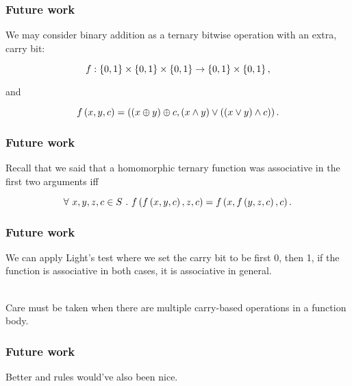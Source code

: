 \begin{frame}[plain]

\frametitle{Future work}

We may consider binary addition as a ternary bitwise operation with an extra,
carry bit:

\[f : \left\{{0,1}\right\} \times \left\{{0,1}\right\} \times \left\{{0,1}\right\} \rightarrow \left\{{0,1}\right\} \times
\left\{{0,1}\right\},\]

and

\[f\left({x,y,c}\right)=\left({\left({x \oplus y}\right) \oplus c, \left({x \wedge y}\right) \vee \left({ \left({ x \vee y}\right)
\wedge c}\right)}\right).\]

\end{frame}

\begin{frame}[plain]

\frametitle{Future work}

Recall that we said that a homomorphic ternary function was associative in the
first two arguments iff

\[\forall\ x,y,z,c\in S\ .\ f\p{f\p{x,y,c}, z,c} = f\p{x, f\p{y,z,c},c}.\]

\end{frame}

\begin{frame}[plain]

\frametitle{Future work}

We can apply Light's test where we set the carry bit to be first 0, then 1, if
the function is associative in both cases, it is associative in general.

\ \\

Care must be taken when there are multiple carry-based operations in a function
body.

\end{frame}

\begin{frame}[plain]

\frametitle{Future work}

Better \LMIN and \LMAX rules would've also been nice.

\end{frame}
